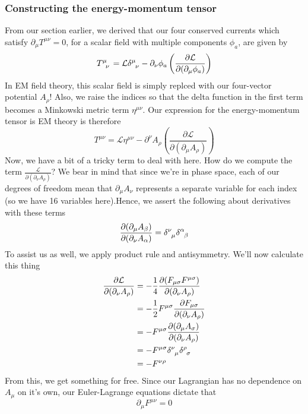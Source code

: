 \documentclass[11pt, oneside]{article}   	%
\theoremstyle{newline}
\theoremstyle{newline}
\theoremstyle{newline}
\theoremstyle{newline}
\theoremstyle{newline}
\begin{document}
\subsubsection{Constructing the energy-momentum tensor}
From our section earlier, we derived that our four conserved currents which satisfy $ \partial_\mu T^{ \mu \nu} = 0 $, for a scalar field with multiple components $ \phi_a$, are given by 
\[
T\indices{^\mu_\nu} = \mathcal{L} \delta \indices{^\mu_\nu}  - \partial_\nu \phi_a \left( \frac{ \partial \mathcal{L} }{ \partial ( \partial_\mu \phi_a ) } \right) 
\] 
In EM field theory, this scalar field is simply replced with our four-vector potential $A_\rho$! Also, we raise the indices so that the delta function in the first term becomes a Minkowski metric term $\eta^{ \mu \nu } $. Our expression for the energy-momentum tensor is EM theory is therefore 
\[ 
T^{ \mu \nu} = \mathcal{L} \eta^{ \mu\nu}  - \partial^\nu A_\rho \left( \frac{ \partial \mathcal{ L}}{ \partial ( \partial_\mu A_\rho ) } \right) 
\] 
Now, we have a bit of a tricky term to deal with here. How do we compute the term $ \frac{ \mathcal{L} }{ \partial ( \partial_\nu A_\rho) } $? We bear in mind that since we're in phase space, each of our degrees of freedom mean that $\partial_\mu A_\nu $ represents a separate variable for each index (so we have 16 variables here).Hence, we assert the following about derivatives with these terms
\[ 
\frac{ \partial ( \partial_\mu A_\beta) }{ \partial (\partial_\nu A_\alpha) }  = \delta\indices{^\nu_\mu} \delta \indices{^\alpha_\beta} 
\] 	
To assist us as well, we apply product rule and antisymmetry. We'll now calculate this thing 
\begin{align*} 
\frac{ \partial \mathcal{ L} }{ \partial ( \partial_\nu A_\rho ) } & =  - \frac{1}{4} \frac{ \partial ( F_{\mu \sigma} F^{ \mu \sigma} )}{ \partial ( \partial_\nu A_\rho ) } \\
&=  - \frac{1}{2} F^{\mu \sigma} \frac{ \partial F_{ \mu \sigma } }{ \partial ( \partial_\nu A_\rho) } \\
&=  - F^{ \mu \sigma} \frac{ \partial ( \partial_\mu A_\sigma) }{ \partial ( \partial_\nu A_\rho ) } \\
& =  - F^{ \mu \sigma} \delta \indices{^\nu_\mu} \delta\indices{^\rho_\sigma} \\
&=  - F^{ \nu \rho} 
\end{align*} 
From this, we get something for free. Since our Lagrangian has no dependence on $A_\mu$ on it's own, our Euler-Lagrange equations dictate that 
\[ 
\partial_\mu F^{ \mu \nu}  =0 
\]
\end{document}
